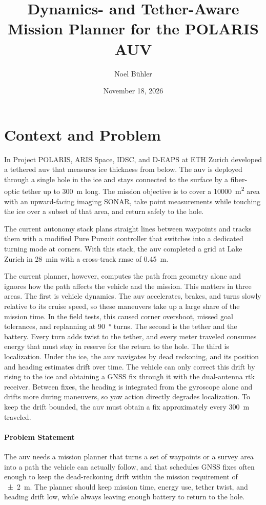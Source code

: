 \documentclass[article,notoc]{IDSCreport}
\title{Dynamics- and Tether-Aware Mission Planner for the POLARIS AUV}
\author{Noel Bühler}
\date{November 18, 2026}
\begin{document}
\section{Context and Problem}
\label{sec:ContextAndProblem}

In Project POLARIS, ARIS Space, IDSC, and D-EAPS at ETH Zurich developed a
tethered \ac{auv} that measures ice thickness from below. The \ac{auv} is
deployed through a single hole in the ice and stays connected to the surface by
a fiber-optic tether up to \qty{300}{\meter} long. The mission objective is to
cover a \qty{10000}{\meter\squared} area with an upward-facing imaging SONAR,
take point measurements while touching the ice over a subset of that area, and
return safely to the hole.

The current autonomy stack plans straight lines between waypoints and tracks
them with a modified Pure Pursuit controller that switches into a dedicated
turning mode at corners. With this stack, the \ac{auv} completed a
 grid at Lake Zurich in \qty{28}{\minute} with a
cross-track \ac{rmse} of \qty{0.45}{\meter}.

The current planner, however, computes the path from geometry alone and ignores
how the path affects the vehicle and the mission. This matters in three areas.
The first is vehicle dynamics. The \ac{auv} accelerates, brakes, and turns
slowly relative to its cruise speed, so these maneuvers take up a large share
of the mission time. In the field tests, this caused corner overshoot, missed
goal tolerances, and replanning at \qty{90}{\degree} turns.
The second is the tether and the battery. Every turn adds twist to the tether,
and every meter traveled consumes energy that must stay in reserve for the
return to the hole.
The third is localization. Under the ice, the \ac{auv} navigates by dead
reckoning, and its position and heading estimates drift over time. The vehicle
can only correct this drift by rising to the ice and obtaining a GNSS fix
through it with the dual-antenna \ac{rtk} receiver. Between fixes, the heading
is integrated from the gyroscope alone and drifts more during maneuvers, so yaw
action directly degrades localization. To keep the drift bounded, the \ac{auv}
must obtain a fix approximately every \qty{300}{\meter} traveled.

\paragraph{Problem Statement} The \ac{auv} needs a mission planner that turns a
set of waypoints or a survey area into a path the vehicle can actually follow,
and that schedules GNSS fixes often enough to keep the dead-reckoning drift
within the mission requirement of \qty{\pm 2}{\meter}. The planner should keep
mission time, energy use, tether twist, and heading drift low, while always
leaving enough battery to return to the hole.
\end{document}
